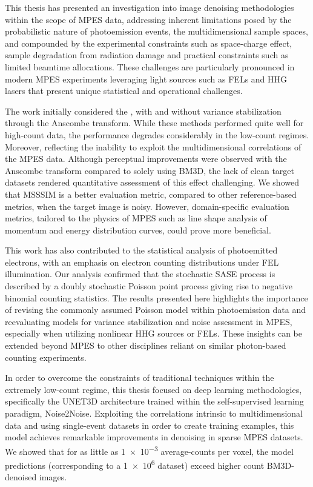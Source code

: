This thesis has presented an investigation into image denoising methodologies within the scope of \gls{MPES} data, addressing inherent limitations posed by the probabilistic nature of photoemission events, the multidimensional sample spaces, and compounded by the experimental constraints such as space-charge effect, sample degradation from radiation damage and practical constraints such as limited  beamtime allocations. These challenges are particularly pronounced in modern \gls{MPES} experiments leveraging light sources such as \glspl{FEL} and \gls{HHG} lasers that present unique statistical and operational challenges.

The work initially considered the , with and without variance stabilization through the Anscombe transform. While these methods performed quite well for high-count data, the performance degrades considerably in the low-count regimes. Moreover, reflecting the inability to exploit the multidimensional correlations of the MPES data. Although perceptual improvements were observed with the Anscombe transform compared to solely using \gls{BM3D}, the lack of clean target datasets rendered quantitative assessment of this effect challenging. We showed that \gls{MSSSIM} is a better evaluation metric, compared to other reference-based metrics, when the target image is noisy. However, domain-specific evaluation metrics, tailored to the physics of \gls{MPES} such as line shape analysis of momentum and energy distribution curves, could prove more beneficial.


This work has also contributed to the statistical analysis of photoemitted electrons, with an emphasis on electron counting distributions under FEL illumination. Our analysis confirmed that the stochastic SASE process is described by a doubly stochastic Poisson point process giving rise to negative binomial counting statistics. The results presented here highlights the importance of revising the commonly assumed Poisson model within photoemission data and reevaluating models for variance stabilization and noise assessment in \gls{MPES}, especially when utilizing nonlinear \gls{HHG} sources or \glspl{FEL}. These insights can be extended beyond \gls{MPES} to other disciplines reliant on similar photon-based counting experiments.

In order to overcome the constraints of traditional techniques within the extremely low-count regime, this thesis focused on deep learning methodologies, specifically the UNET3D architecture trained within the self-supervised learning paradigm, Noise2Noise. Exploiting the correlations intrinsic to multidimensional data and using single-event datasets in order to create training examples, this model achieves remarkable improvements in denoising in sparse \gls{MPES} datasets. We showed that for as little as \num{1e-3} average-counts per voxel, the model predictions (corresponding to a \num{1e6} dataset) exceed higher count \gls{BM3D}-denoised images.

